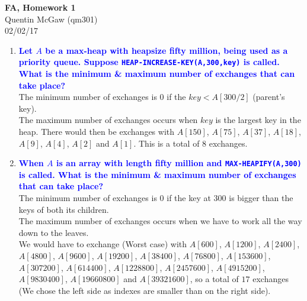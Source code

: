 \documentclass[11pt]{article}
\begin{document}
\begin{center} {\Large\bf FA, Homework 1}  \\ Quentin McGaw (qm301) \\ 02/02/17
\end{center}

\begin{enumerate}
\item \textbf{\textcolor{blue}{Let $A$ be a max-heap with heapsize fifty 
million, being used as a priority queue.  Suppose 
{\tt HEAP-INCREASE-KEY(A,300,key)} is called. What is the minimum & maximum number 
of exchanges that can take place?}}
    \\ The minimum number of exchanges is $0$ if the $key < A[300/2]$ (parent's key). 
    \\ The maximum number of exchanges occurs when $key$ is the largest key in the heap. 
    There would then be exchanges with $A[150]$, $A[75]$, $A[37]$, $A[18]$, $A[9]$, $A[4]$, $A[2]$ and $A[1]$.
    This is a total of $8$ exchanges.

\item \textbf{\textcolor{blue}{When $A$ is an array with length fifty 
million and {\tt MAX-HEAPIFY(A,300)} is called. What is the minimum & maximum 
number of exchanges that can take place?}}
    \\ The minimum number of exchanges is $0$ if the key at $300$ is bigger than the keys of both its children.
    \\ The maximum number of exchanges occurs when we have to work all the way down to the leaves.
    \\ We would have to exchange (Worst case) with $A[600]$, $A[1200]$, $A[2400]$, $A[4800]$, $A[9600]$, $A[19200]$, $A[38400]$, $A[76800]$, $A[153600]$, $A[307200]$, $A[614400]$, $A[1228800]$, $A[2457600]$, $A[4915200]$, $A[9830400]$, $A[19660800]$ and $A[39321600]$, so a total of $17$ exchanges (We chose the left side as indexes are smaller than on the right side).


\end{enumerate}
\end{document}
